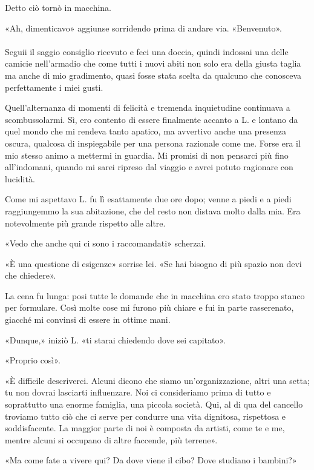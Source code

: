 \documentclass[a4paper,12pt]{book}
\begin{document}
Detto ciò tornò in macchina.

«Ah, dimenticavo» aggiunse sorridendo prima di andare via. «Benvenuto».

\paragraph{}
Seguii il saggio consiglio ricevuto e feci una doccia, quindi indossai una delle
camicie nell'armadio che come tutti i nuovi abiti non solo era della giusta
taglia ma anche di mio gradimento, quasi fosse stata scelta da qualcuno che
conosceva perfettamente i miei gusti.

Quell'alternanza di momenti di felicità e tremenda inquietudine continuava a
scombussolarmi. Sì, ero contento di essere finalmente accanto a L. e lontano da
quel mondo che mi rendeva tanto apatico, ma avvertivo anche una presenza oscura,
qualcosa di inspiegabile per una persona razionale come me. Forse era il mio
stesso animo a mettermi in guardia. Mi promisi di non pensarci più fino
all'indomani, quando mi sarei ripreso dal viaggio e avrei potuto ragionare con
lucidità.

Come mi aspettavo L. fu lì esattamente due ore dopo; venne a piedi e a piedi
raggiungemmo la sua abitazione, che del resto non distava molto dalla mia. Era
notevolmente più grande rispetto alle altre.

«Vedo che anche qui ci sono i raccomandati» scherzai.

«È una questione di esigenze» sorrise lei. «Se hai bisogno di più spazio non
devi che chiedere».

La cena fu lunga: posi tutte le domande che in macchina ero stato troppo stanco
per formulare. Così molte cose mi furono più chiare e fui in parte rasserenato,
giacché mi convinsi di essere in ottime mani.

«Dunque,» iniziò L. «ti starai chiedendo dove sei capitato».

«Proprio così».

«È difficile descriverci. Alcuni dicono che siamo un'organizzazione, altri una
setta; tu non dovrai lasciarti influenzare. Noi ci consideriamo prima di tutto
e soprattutto una enorme famiglia, una piccola società. Qui, al di qua del
cancello troviamo tutto ciò che ci serve per condurre una vita dignitosa,
rispettosa e soddisfacente. La maggior parte di noi è composta da artisti, come
te e me, mentre alcuni si occupano di altre faccende, più terrene».

«Ma come fate a vivere qui? Da dove viene il cibo? Dove studiano i bambini?»
\end{document}
